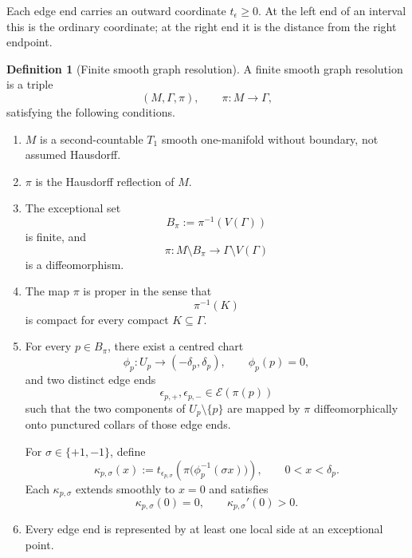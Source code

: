 \documentclass[11pt]{article}
\theoremstyle{plain}
\theoremstyle{definition}
\newtheorem{definition}[theorem]{Definition}
\begin{document}
Each edge end carries an outward coordinate
\(t_\epsilon\geq0\).
At the left end of an interval this is the ordinary coordinate; at the
right end it is the distance from the right endpoint.

\begin{definition}[Finite smooth graph resolution]
\label{def:finite-smooth-graph-resolution}
A finite smooth graph resolution is a triple
\[
  (M,\Gamma,\pi),
  \qquad
  \pi:M\longrightarrow\Gamma,
\]
satisfying the following conditions.

\begin{enumerate}[label=\textup{(\roman*)}]
  \item \(M\) is a second-countable \(T_1\) smooth one-manifold
        without boundary, not assumed Hausdorff.

  \item \(\pi\) is the Hausdorff reflection of \(M\).

  \item The exceptional set
        \[
          B_\pi:=\pi^{-1}(V(\Gamma))
        \]
        is finite, and
        \[
          \pi:
          M\setminus B_\pi
          \longrightarrow
          \Gamma\setminus V(\Gamma)
        \]
        is a diffeomorphism.

  \item The map \(\pi\) is proper in the sense that
        \[
          \pi^{-1}(K)
        \]
        is compact for every compact
        \(K\subseteq\Gamma\).

  \item For every \(p\in B_\pi\), there exist a centred chart
        \[
          \phi_p:
          U_p\longrightarrow(-\delta_p,\delta_p),
          \qquad
          \phi_p(p)=0,
        \]
        and two distinct edge ends
        \[
          \epsilon_{p,+},
          \epsilon_{p,-}
          \in
          \mathcal E(\pi(p))
        \]
        such that the two components of \(U_p\setminus\{p\}\) are
        mapped by \(\pi\) diffeomorphically onto punctured collars of
        those edge ends.

        For \(\sigma\in\{+1,-1\}\), define
        \[
          \kappa_{p,\sigma}(x)
          :=
          t_{\epsilon_{p,\sigma}}
          \left(
            \pi\bigl(\phi_p^{-1}(\sigma x)\bigr)
          \right),
          \qquad
          0<x<\delta_p.
        \]
        Each \(\kappa_{p,\sigma}\) extends smoothly to \(x=0\) and
        satisfies
        \[
          \kappa_{p,\sigma}(0)=0,
          \qquad
          \kappa_{p,\sigma}'(0)>0.
        \]

  \item Every edge end is represented by at least one local side at
        an exceptional point.
\end{enumerate}
\end{definition}
\end{document}
